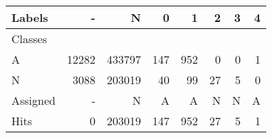 \begin{tabular}{l|r|r|r|r|r|r|r}
Labels &      - &       N &    0 &    1 &   2 &  3 &  4 \\\hline
Classes  &        &         &      &      &     &    &    \\\hline
\hline
A        &  12282 &  433797 &  147 &  952 &   0 &  0 &  1 \\\hline
N        &   3088 &  203019 &   40 &   99 &  27 &  5 &  0 \\\hline
\hline
Assigned &      - &       N &    A &    A &   N &  N &  A \\\hline
Hits     &      0 &  203019 &  147 &  952 &  27 &  5 &  1 
\end{tabular}

